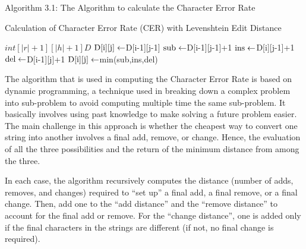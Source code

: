 \documentclass[review]{elsarticle}
\newcommand{\minbox}[2]{%
	\mathmakebox[\ifdim#1<\width\width\else#1\fi]{#2}}
\newcommand{\Let}[2]{\State $ \minbox{1em}{#1} \gets #2 $}
\newcommand{\q}[1]{``#1''}
\begin{document}
Algorithm 3.1: The Algorithm to calculate the Character Error Rate
\begin{algorithm}[H]
\caption{Calculation of Character Error Rate (CER) with Levenshtein Edit Distance
	\label{alg:packed-dna-hamming}}
\begin{algorithmic}[1]
	\Statex
	
	
	\State $int[|r| +1][|h| + 1] D$  
	\EndIf
	\EndFor
	\EndFor
	   
	\Let {$D[i][j]$}{$D[i-1][j-1]$}
	\Else
	\Let {$sub$}{$D[i-1][j-1]+1$}
	\Let {$ins$}{$D[i][j-1]+1$}    
	\Let {$del$}{$D[i-1][j]+1$}    
	\Let {$D[i][j]$}{$min(sub,ins,del)$}    
	\EndIf
	\EndFor
	\EndFor
	
	
	\State {}
	\EndFunction
\end{algorithmic}
\end{algorithm}

The algorithm that is used in computing the Character Error Rate is based on dynamic programming, a technique used in breaking down a complex problem into sub-problem to avoid computing multiple time the same sub-problem. It basically involves using past knowledge to make solving a future problem easier. The main challenge in this approach is whether the cheapest way to convert one string into another involves a final add, remove, or change. Hence, the evaluation of all the three possibilities and the return of the minimum distance from among the three.

In each case, the algorithm recursively computes the distance (number of adds, removes, and changes) required to \q{set up} a final add, a final remove, or a final change. Then, add one to the \q{add distance} and the \q{remove distance} to account for the final add or remove. For the \q{change distance}, one is added only if the final characters in the strings are different (if not, no final change is required).
\end{document}
